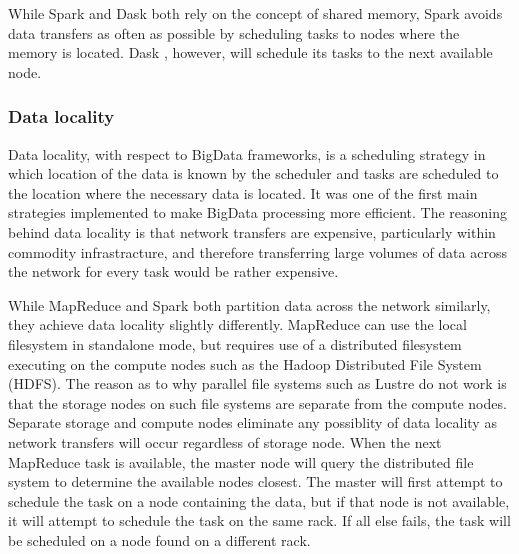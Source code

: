 \documentclass{report}
\begin{document}
                    
                    While Spark and Dask both rely on the concept of shared 
                    memory, Spark avoids data transfers as often as possible by
                    scheduling tasks to nodes where the memory is located. Dask
                    , however, will schedule its tasks to the next available 
                    node.
                    
                    
                \subsubsection{Data locality}
                    Data locality, with respect to BigData frameworks, is a
                    scheduling
                    strategy in which location of the data is known by the 
                    scheduler and tasks are scheduled to the location where the
                    necessary data is located. It was one of the first main 
                    strategies implemented to make BigData processing more 
                    efficient. The reasoning behind data locality is that 
                    network transfers are expensive, particularly within 
                    commodity infrastracture, and therefore transferring large 
                    volumes of data across the network for every task would be 
                    rather expensive.

                    While MapReduce and Spark both partition data across the 
                    network similarly, they achieve data locality slightly 
                    differently. MapReduce can use the local filesystem in 
                    standalone mode, but requires use of a distributed 
                    filesystem executing on the compute nodes such as the 
                    Hadoop Distributed File System (HDFS). The reason as to why
                    parallel file systems such as Lustre do not work is that 
                    the storage nodes on such file systems are separate from 
                    the compute nodes. Separate storage and compute nodes 
                    eliminate any possiblity of data locality as network 
                    transfers will occur regardless of storage node. When the 
                    next MapReduce task is available, the master node will 
                    query the distributed file system to determine the 
                    available nodes closest. The master will first attempt to
                    schedule the task on a node containing the data, but if 
                    that node is not available, it will attempt to schedule
                    the task on the same rack. If all else fails, the task will
                    be scheduled on a node found on a different rack. 
\end{document}
